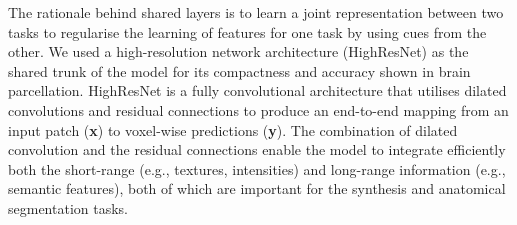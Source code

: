 The rationale behind shared layers is to learn a joint representation between two tasks to regularise the learning of features for one task by using cues from the other. We used a high-resolution network architecture (HighResNet) \cite{li2017compactness} as the shared trunk of the model for its compactness and accuracy shown in brain parcellation. HighResNet is a fully convolutional architecture that utilises dilated convolutions and residual connections to produce an end-to-end mapping from an input patch (\textbf{x}) to voxel-wise predictions (\textbf{y}). The combination of dilated convolution and the residual connections enable the model to integrate efficiently both the short-range (e.g., textures, intensities) and long-range information (e.g., semantic features), both of which are important for the synthesis and anatomical segmentation tasks. 



